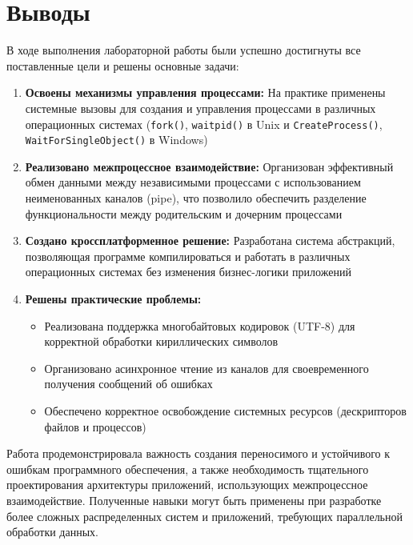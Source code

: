 \section{Выводы}

В ходе выполнения лабораторной работы были успешно достигнуты все поставленные цели и решены основные задачи:

\begin{enumerate}
    \item \textbf{Освоены механизмы управления процессами:} На практике применены системные вызовы для создания и управления процессами в различных операционных системах (\texttt{fork()}, \texttt{waitpid()} в Unix и \texttt{CreateProcess()}, \texttt{WaitForSingleObject()} в Windows)
    
    \item \textbf{Реализовано межпроцессное взаимодействие:} Организован эффективный обмен данными между независимыми процессами с использованием неименованных каналов (pipe), что позволило обеспечить разделение функциональности между родительским и дочерним процессами
    
    \item \textbf{Создано кроссплатформенное решение:} Разработана система абстракций, позволяющая программе компилироваться и работать в различных операционных системах без изменения бизнес-логики приложений
    
    \item \textbf{Решены практические проблемы:} 
    \begin{itemize}
        \item Реализована поддержка многобайтовых кодировок (UTF-8) для корректной обработки кириллических символов
        \item Организовано асинхронное чтение из каналов для своевременного получения сообщений об ошибках
        \item Обеспечено корректное освобождение системных ресурсов (дескрипторов файлов и процессов)
    \end{itemize}
\end{enumerate}

Работа продемонстрировала важность создания переносимого и устойчивого к ошибкам программного обеспечения, а также необходимость тщательного проектирования архитектуры приложений, использующих межпроцессное взаимодействие. Полученные навыки могут быть применены при разработке более сложных распределенных систем и приложений, требующих параллельной обработки данных.

\pagebreak
